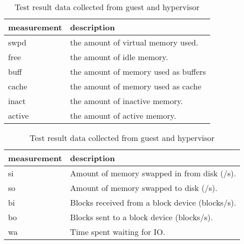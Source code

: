 \begin{table}[h]
\begin{subtable}[h]{0.45\textwidth}
\begin{tabular}{ l p{5cm} }
       measurement & description \\
       \hline
       swpd  & the amount of virtual memory used. \\
       free  & the amount of idle memory. \\
       buff  & the amount of memory used as buffers \\
       cache & the amount of memory used as cache \\
       inact & the amount of inactive memory. \\
       active & the amount of active memory. \\
       \hline
\end{tabular}
\caption{Virtual memory data collected}
\label{fig:memory}
\end{subtable}
\hfill
\begin{subtable}[h]{0.45\textwidth}
\begin{tabular}{ l p{5cm} }
       measurement & description \\
       \hline
       si & Amount of memory swapped in from disk (/s). \\
       so & Amount of memory swapped to disk (/s). \\
       bi & Blocks received from a block device (blocks/s). \\
       bo & Blocks sent to a block device (blocks/s). \\
       wa & Time spent waiting for IO. \\
       \hline
\end{tabular}
\caption{I/O read data collected}
\label{fig:io}
\end{subtable}
\caption{Test result data collected from guest and hypervisor}
\end{table}

